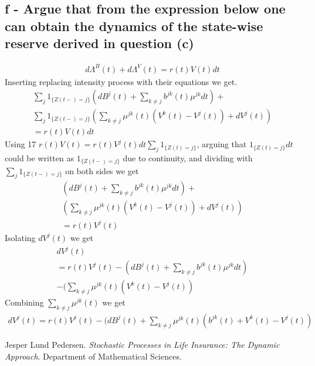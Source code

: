 \documentclass[12pt]{article}
\begin{document}
\newpage

\subsection{f - Argue that from the expression below one can obtain the dynamics of the state-wise reserve derived in question (c)}

\begin{equation}
\begin{split}
d\Lambda^B(t) + d\Lambda^V(t) = r(t)V(t)dt
\end{split}
\end{equation}
Inserting replacing intensity process with their equations we get.
\begin{equation}
\begin{split}
\sum_j1_{\{Z(t-)=j\}} (dB^j(t) + \sum_{k\neq j}b^{jk}(t)\mu^{jk}dt)
+ \\
\sum_j 1_{\{Z(t-)=j\}}(\sum_{k\neq j}\mu^{jk}(t)(V^k(t) - V^j(t)) + dV^j(t)) \\
= r(t)V(t)dt
\end{split}
\end{equation}
Using 17 $r(t)V(t) = r(t)V^j(t)dt \sum_j 1_{\{Z(t)=j\}}$, arguing that $1_{\{Z(t)=j\}}dt$ could be written as $1_{\{Z(t-)=j\}}$ due to continuity, and dividing with $\sum_j 1_{\{Z(t-)=j\}}$ on both sides we get
\begin{equation}
\begin{split}
(dB^j(t) + \sum_{k\neq j}b^{jk}(t)\mu^{jk}dt)
+ \\
(\sum_{k\neq j}\mu^{jk}(t)(V^k(t) - V^j(t)) + dV^j(t)) \\
= r(t)V^j(t)
\end{split}
\end{equation}
Isolating $dV^j(t)$ we get
\begin{equation}
\begin{split}
dV^j(t) \\
= r(t)V^j(t) - (dB^j(t) + \sum_{k\neq j}b^{jk}(t)\mu^{jk}dt) \\
- (\sum_{k\neq j}\mu^{jk}(t)(V^k(t) - V^j(t))
\end{split}
\end{equation}
Combining $\sum_{k\neq j}\mu^{jk}(t)$ we get
\begin{equation}
\begin{split}
dV^j(t) 
= r(t)V^j(t) - (dB^j(t) + \sum_{k\neq j}\mu^{jk}(t)(b^{jk}(t) + V^k(t) - V^j(t))
\end{split}
\end{equation}

\newpage

\begin{thebibliography}{9}

  Jesper Lund Pedersen.
  \textit{Stochastic Processes in Life Insurance: The Dynamic Approach}.
  Department of Mathematical Sciences.

\end{thebibliography}
\end{document}
